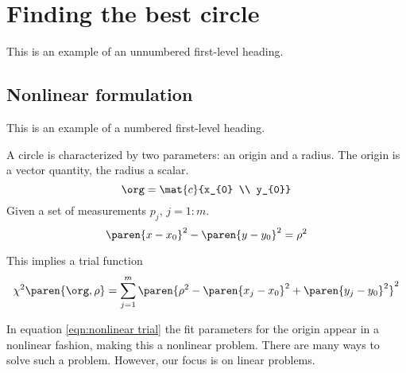 \section{\label{sec:best circle}Finding the best circle}
This is an example of an unnumbered first-level heading.


\subsection{Nonlinear formulation}  %
This is an example of a numbered first-level heading.

A circle is characterized by two parameters: an origin and a radius. The origin is a vector quantity, the radius a scalar.
  \begin{equation}
    \org = \mat{c}{x_{0} \\ y_{0}}
  \end{equation}
Given a set of measurements $p_{j}$, $j=1\colon m$.
  \begin{equation}
    \paren{ x - x_{0} }^{2} - \paren{ y - y_{0} }^{2} = \rho^{2}
    \label{eqn:nonlinear trial}
  \end{equation}

This implies a trial function
  \begin{equation}
    \chi^{2}\paren{\org,\rho} = \sum_{j=1}^{m} \paren{\rho^{2} - \paren{ x_{j} - x_{0} }^{2} + \paren{ y_{j} - y_{0} }^{2}}^{2}
  \end{equation}

In equation \eqref{eqn:nonlinear trial} the fit parameters for the origin appear in a nonlinear fashion, making this a nonlinear problem. There are many ways to solve such a problem. However, our focus is on linear problems.


